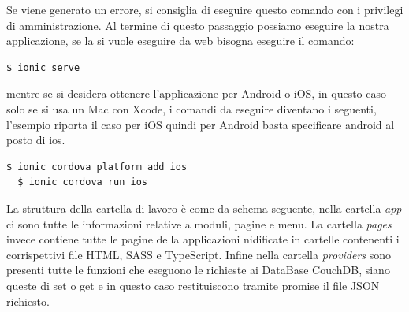 \documentclass[a4paper,titlepage]{book}
\begin{document}
Se viene generato un errore, si consiglia di eseguire questo comando con i privilegi di amministrazione. Al termine di questo passaggio possiamo eseguire la nostra applicazione, se la si vuole eseguire da web bisogna eseguire il comando:

\begin{lstlisting}[language=bash]
  $ ionic serve
\end{lstlisting}

mentre se si desidera ottenere l'applicazione per Android o iOS, in questo caso solo se si usa un Mac con Xcode, i comandi da eseguire diventano i seguenti, l'esempio riporta il caso per iOS quindi per Android basta specificare android al posto di ios.

\begin{lstlisting}[language=bash]
  $ ionic cordova platform add ios
  $ ionic cordova run ios
\end{lstlisting}

La struttura della cartella di lavoro \`{e} come da schema seguente, nella cartella \textit{app} ci sono tutte le informazioni relative a moduli, pagine e menu. La cartella \textit{pages} invece contiene tutte le pagine della applicazioni nidificate in cartelle contenenti i corrispettivi file HTML, SASS e TypeScript.
Infine nella cartella \textit{providers} sono presenti tutte le funzioni che eseguono le richieste ai DataBase CouchDB, siano queste di set o get e in questo caso restituiscono tramite promise il file JSON richiesto.


\end{document}
